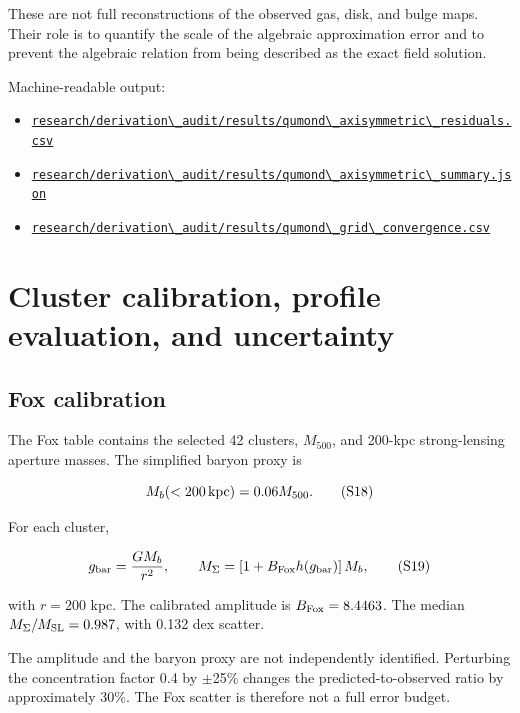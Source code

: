 \documentclass[utf8]{frontiers_suppmat}
\providecommand{\tightlist}{}
\newcommand{\passthrough}[1]{#1}
\begin{document}
These are not full reconstructions of the observed gas, disk, and bulge maps. Their role is to quantify the scale of the algebraic approximation error and to prevent the algebraic relation from being described as the exact field solution.

Machine-readable output:

\begin{itemize}
\tightlist
\item
  \href{https://github.com/lrspeiser/sigmagravity/blob/main/research/derivation_audit/results/qumond_axisymmetric_residuals.csv}{\passthrough{\lstinline!research/derivation\_audit/results/qumond\_axisymmetric\_residuals.csv!}}
\item
  \href{https://github.com/lrspeiser/sigmagravity/blob/main/research/derivation_audit/results/qumond_axisymmetric_summary.json}{\passthrough{\lstinline!research/derivation\_audit/results/qumond\_axisymmetric\_summary.json!}}
\item
  \href{https://github.com/lrspeiser/sigmagravity/blob/main/research/derivation_audit/results/qumond_grid_convergence.csv}{\passthrough{\lstinline!research/derivation\_audit/results/qumond\_grid\_convergence.csv!}}
\end{itemize}

\section{Cluster calibration, profile evaluation, and uncertainty}\label{s6.-cluster-calibration-profile-evaluation-and-uncertainty}

\subsection{Fox calibration}\label{s6.1-fox-calibration}

The Fox table contains the selected 42 clusters, \(M_{500}\), and 200-kpc strong-lensing aperture masses. The simplified baryon proxy is

\[
M_b(<200{\rm\,kpc})=0.06M_{500}.
\tag{S18}
\]

For each cluster,

\[
g_{\rm bar}=\frac{GM_b}{r^2},
\qquad
M_{\Sigma}=\left[1+B_{\rm Fox}h(g_{\rm bar})\right]M_b,
\tag{S19}
\]

with \(r=200\) kpc. The calibrated amplitude is \(B_{\rm Fox}=8.4463\). The median \(M_\Sigma/M_{\rm SL}=0.987\), with 0.132 dex scatter.

The amplitude and the baryon proxy are not independently identified. Perturbing the concentration factor 0.4 by \(\pm\)25\% changes the predicted-to-observed ratio by approximately 30\%. The Fox scatter is therefore not a full error budget.
\end{document}
